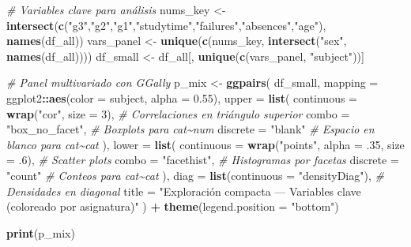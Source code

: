 \documentclass[
]{book}
\newenvironment{Shaded}{\begin{snugshade}}{\end{snugshade}}
\newcommand{\AttributeTok}[1]{\textcolor[rgb]{0.13,0.29,0.53}{#1}}
\newcommand{\CommentTok}[1]{\textcolor[rgb]{0.56,0.35,0.01}{\textit{#1}}}
\newcommand{\DecValTok}[1]{\textcolor[rgb]{0.00,0.00,0.81}{#1}}
\newcommand{\FloatTok}[1]{\textcolor[rgb]{0.00,0.00,0.81}{#1}}
\newcommand{\FunctionTok}[1]{\textcolor[rgb]{0.13,0.29,0.53}{\textbf{#1}}}
\newcommand{\NormalTok}[1]{#1}
\newcommand{\OtherTok}[1]{\textcolor[rgb]{0.56,0.35,0.01}{#1}}
\newcommand{\SpecialCharTok}[1]{\textcolor[rgb]{0.81,0.36,0.00}{\textbf{#1}}}
\newcommand{\StringTok}[1]{\textcolor[rgb]{0.31,0.60,0.02}{#1}}
\begin{document}
\begin{Shaded}
\begin{Highlighting}[]
\CommentTok{\# Variables clave para análisis}
\NormalTok{nums\_key }\OtherTok{\textless{}{-}} \FunctionTok{intersect}\NormalTok{(}\FunctionTok{c}\NormalTok{(}\StringTok{"g3"}\NormalTok{,}\StringTok{"g2"}\NormalTok{,}\StringTok{"g1"}\NormalTok{,}\StringTok{"studytime"}\NormalTok{,}\StringTok{"failures"}\NormalTok{,}\StringTok{"absences"}\NormalTok{,}\StringTok{"age"}\NormalTok{), }\FunctionTok{names}\NormalTok{(df\_all))}
\NormalTok{vars\_panel }\OtherTok{\textless{}{-}} \FunctionTok{unique}\NormalTok{(}\FunctionTok{c}\NormalTok{(nums\_key, }\FunctionTok{intersect}\NormalTok{(}\StringTok{"sex"}\NormalTok{, }\FunctionTok{names}\NormalTok{(df\_all))))}
\NormalTok{df\_small }\OtherTok{\textless{}{-}}\NormalTok{ df\_all[, }\FunctionTok{unique}\NormalTok{(}\FunctionTok{c}\NormalTok{(vars\_panel, }\StringTok{"subject"}\NormalTok{))]}

\CommentTok{\# Panel multivariado con GGally}
\NormalTok{p\_mix }\OtherTok{\textless{}{-}} \FunctionTok{ggpairs}\NormalTok{(}
\NormalTok{  df\_small,}
  \AttributeTok{mapping =}\NormalTok{ ggplot2}\SpecialCharTok{::}\FunctionTok{aes}\NormalTok{(}\AttributeTok{color =}\NormalTok{ subject, }\AttributeTok{alpha =} \FloatTok{0.55}\NormalTok{),}
  \AttributeTok{upper =} \FunctionTok{list}\NormalTok{(}
    \AttributeTok{continuous =} \FunctionTok{wrap}\NormalTok{(}\StringTok{"cor"}\NormalTok{, }\AttributeTok{size =} \DecValTok{3}\NormalTok{),    }\CommentTok{\# Correlaciones en triángulo superior}
    \AttributeTok{combo      =} \StringTok{"box\_no\_facet"}\NormalTok{,           }\CommentTok{\# Boxplots para cat\textasciitilde{}num}
    \AttributeTok{discrete   =} \StringTok{"blank"}                   \CommentTok{\# Espacio en blanco para cat\textasciitilde{}cat}
\NormalTok{  ),}
  \AttributeTok{lower =} \FunctionTok{list}\NormalTok{(}
    \AttributeTok{continuous =} \FunctionTok{wrap}\NormalTok{(}\StringTok{"points"}\NormalTok{, }\AttributeTok{alpha =}\NormalTok{ .}\DecValTok{35}\NormalTok{, }\AttributeTok{size =}\NormalTok{ .}\DecValTok{6}\NormalTok{),  }\CommentTok{\# Scatter plots}
    \AttributeTok{combo      =} \StringTok{"facethist"}\NormalTok{,              }\CommentTok{\# Histogramas por facetas}
    \AttributeTok{discrete   =} \StringTok{"count"}                   \CommentTok{\# Conteos para cat\textasciitilde{}cat}
\NormalTok{  ),}
  \AttributeTok{diag  =} \FunctionTok{list}\NormalTok{(}\AttributeTok{continuous =} \StringTok{"densityDiag"}\NormalTok{), }\CommentTok{\# Densidades en diagonal}
  \AttributeTok{title =} \StringTok{"Exploración compacta — Variables clave (coloreado por asignatura)"}
\NormalTok{) }\SpecialCharTok{+} \FunctionTok{theme}\NormalTok{(}\AttributeTok{legend.position =} \StringTok{"bottom"}\NormalTok{)}

\FunctionTok{print}\NormalTok{(p\_mix)}
\end{Highlighting}
\end{Shaded}
\end{document}
